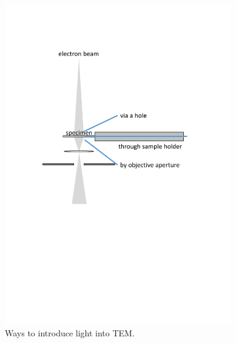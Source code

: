 \begin{figure}  
\centering
\includegraphics[width=280pt]{figures/figure2_1}
\caption[To put light into TEM.]{Ways to introduce light into TEM.
\label{fig:2_1}}
\end{figure}

